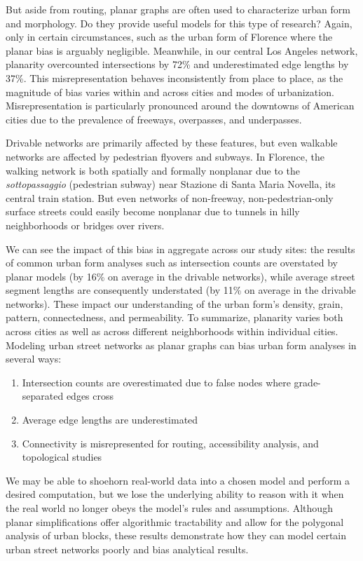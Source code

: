 \documentclass[Afour,doublespace,sageh,times]{sagej}
\begin{document}
But aside from routing, planar graphs are often used to characterize urban form and morphology. Do they provide useful models for this type of research? Again, only in certain circumstances, such as the urban form of Florence where the planar bias is arguably negligible. Meanwhile, in our central Los Angeles network, planarity overcounted intersections by 72\% and underestimated edge lengths by 37\%. This misrepresentation behaves inconsistently from place to place, as the magnitude of bias varies within and across cities and modes of urbanization. Misrepresentation is particularly pronounced around the downtowns of American cities due to the prevalence of freeways, overpasses, and underpasses.

Drivable networks are primarily affected by these features, but even walkable networks are affected by pedestrian flyovers and subways. In Florence, the walking network is both spatially and formally nonplanar due to the \textit{sottopassaggio} (pedestrian subway) near Stazione di Santa Maria Novella, its central train station. But even networks of non-freeway, non-pedestrian-only surface streets could easily become nonplanar due to tunnels in hilly neighborhoods or bridges over rivers.

We can see the impact of this bias in aggregate across our study sites: the results of common urban form analyses such as intersection counts are overstated by planar models (by 16\% on average in the drivable networks), while average street segment lengths are consequently understated (by 11\% on average in the drivable networks). These impact our understanding of the urban form's density, grain, pattern, connectedness, and permeability. To summarize, planarity varies both across cities as well as across different neighborhoods within individual cities. Modeling urban street networks as planar graphs can bias urban form analyses in several ways:

\begin{enumerate}
	\item{Intersection counts are overestimated due to false nodes where grade-separated edges cross}
	\item{Average edge lengths are underestimated}
	\item{Connectivity is misrepresented for routing, accessibility analysis, and topological studies}
\end{enumerate}

We may be able to shoehorn real-world data into a chosen model and perform a desired computation, but we lose the underlying ability to reason with it when the real world no longer obeys the model's rules and assumptions. Although planar simplifications offer algorithmic tractability and allow for the polygonal analysis of urban blocks, these results demonstrate how they can model certain urban street networks poorly and bias analytical results.
\end{document}
